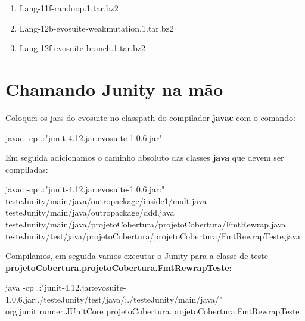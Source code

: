 \documentclass[11pt]{article}
\providecommand{\tightlist}{%
      \setlength{\itemsep}{0pt}\setlength{\parskip}{0pt}}
\newenvironment{Shaded}{}{}
\newcommand{\StringTok}[1]{\textcolor[rgb]{0.25,0.44,0.63}{{#1}}}
\newcommand{\NormalTok}[1]{{#1}}
\newcommand{\ExtensionTok}[1]{{#1}}
\begin{document}
\begin{enumerate}
\def\labelenumi{\arabic{enumi}.}
\tightlist
\item
  Lang-11f-randoop.1.tar.bz2
\item
  Lang-12b-evosuite-weakmutation.1.tar.bz2
\item
  Lang-12f-evosuite-branch.1.tar.bz2
\end{enumerate}

    \hypertarget{chamando-junity-na-muxe3o}{%
\section{Chamando Junity na mão}\label{chamando-junity-na-muxe3o}}

    Coloquei os jars do evosuite no classpath do compilador \textbf{javac}
com o comando:

    \begin{Shaded}
\begin{Highlighting}[]
\ExtensionTok{javac}\NormalTok{ -cp .:}\StringTok{"junit-4.12.jar:evosuite-1.0.6.jar"}
\end{Highlighting}
\end{Shaded}

    Em seguida adicionamos o caminho absoluto das classes \textbf{java} que
devem ser compiladas:

    \begin{Shaded}
\begin{Highlighting}[]
\ExtensionTok{javac}\NormalTok{ -cp .:}\StringTok{"junit-4.12.jar:evosuite-1.0.6.jar:"}\NormalTok{ testeJunity/main/java/outropackage/inside1/mult.java testeJunity/main/java/outropackage/ddd.java testeJunity/main/java/projetoCobertura/projetoCobertura/FmtRewrap.java testeJunity/test/java/projetoCobertura/projetoCobertura/FmtRewrapTeste.java}
\end{Highlighting}
\end{Shaded}

    Compilamos, em seguida vamos executar o Junity para a classe de teste
\textbf{projetoCobertura.projetoCobertura.FmtRewrapTeste}:

    \begin{Shaded}
\begin{Highlighting}[]
\ExtensionTok{java}\NormalTok{ -cp .:}\StringTok{"junit-4.12.jar:evosuite-1.0.6.jar:./testeJunity/test/java/:./testeJunity/main/java/"}\NormalTok{ org.junit.runner.JUnitCore projetoCobertura.projetoCobertura.FmtRewrapTeste}
\end{Highlighting}
\end{Shaded}
\end{document}
